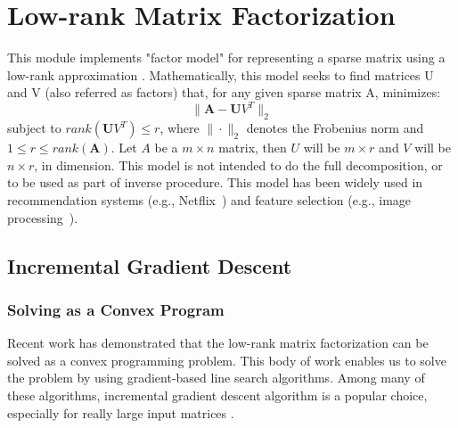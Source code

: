 
\chapter{Low-rank Matrix Factorization}

This module implements "factor model" for representing a sparse matrix using a low-rank approximation \cite{DBLP:conf/icml/SrebroJ03}.
Mathematically, this model seeks to find matrices U and V (also referred as factors) that, for any given sparse matrix A, minimizes:
\[ \|\boldsymbol A - \boldsymbol UV^{T} \|_2 \]
subject to $rank(\boldsymbol UV^{T}) \leq r$, where $\|\cdot\|_2$ denotes the Frobenius norm and $1 \leq r \leq rank(\boldsymbol A)$.
Let $A$ be a $m \times n$ matrix, then $U$ will be $m \times r$ and $V$ will be $n \times r$, in dimension.
This model is not intended to do the full decomposition, or to be used as part of inverse procedure.
This model has been widely used in recommendation systems (e.g., Netflix~\cite{:TheNetflixPrize07}) and feature selection (e.g., image processing~\cite{DBLP:conf/nips/WrightGRPM09}).

\section{Incremental Gradient Descent}

\subsection{Solving as a Convex Program}
Recent work \cite{DBLP:journals/cacm/CandesR12, DBLP:journals/siamrev/RechtFP10} has demonstrated that the low-rank matrix factorization can be solved as a convex programming problem.
This body of work enables us to solve the problem by using gradient-based line search algorithms.
Among many of these algorithms, incremental gradient descent algorithm is a popular choice, especially for really large input matrices \cite{DBLP:conf/sigmod/FengKRR12, DBLP:conf/kdd/GemullaNHS11}.

